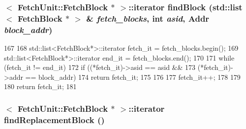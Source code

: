 \hypertarget{classFetchUnit_ac92ba32e2d79eb977cc570fc6da90fcd}{
\subsubsection[{findBlock}]{$<$ {\bf FetchUnit::FetchBlock} $\ast$ $>$::iterator findBlock ({\bf std::list}$<$ {\bf FetchBlock} $\ast$ $>$ \& {\em fetch\_\-blocks}, \/  int {\em asid}, \/  {\bf Addr} {\em block\_\-addr})}}
\label{classFetchUnit_ac92ba32e2d79eb977cc570fc6da90fcd}



\begin{DoxyCode}
167 {
168     std::list<FetchBlock*>::iterator fetch_it = fetch_blocks.begin();
169     std::list<FetchBlock*>::iterator end_it = fetch_blocks.end();
170 
171     while (fetch_it != end_it) {
172         if ((*fetch_it)->asid == asid &&
173             (*fetch_it)->addr == block_addr) {
174             return fetch_it;
175         }
176 
177         fetch_it++;
178     }
179 
180     return fetch_it;
181 }
\end{DoxyCode}
\hypertarget{classFetchUnit_aa2c07c0c9648d711cd5916edb942dd4f}{
\subsubsection[{findReplacementBlock}]{$<$ {\bf FetchUnit::FetchBlock} $\ast$ $>$::iterator findReplacementBlock ()}}
\label{classFetchUnit_aa2c07c0c9648d711cd5916edb942dd4f}



